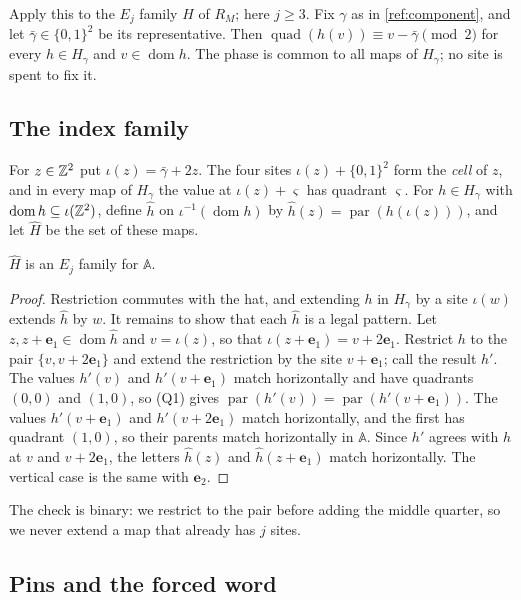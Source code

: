 Apply this to the $E_j$ family $H$ of $R_M$; here $j\ge3$. Fix $\gamma$ as in \cref{ref:component}, and let $\bar\gamma\in\{0,1\}^2$ be its representative. Then $\operatorname{quad}(h(v))\equiv v-\bar\gamma\pmod2$ for every $h\in H_\gamma$ and $v\in\operatorname{dom}h$. The phase is common to all maps of $H_\gamma$; no site is spent to fix it.

\subsection{The index family}\label{ref:sec-index}

For $z\in\mathbb{Z}^2$ put $\iota(z)=\bar\gamma+2z$. The four sites $\iota(z)+\{0,1\}^2$ form the \emph{cell} of $z$, and in every map of $H_\gamma$ the value at $\iota(z)+\varsigma$ has quadrant $\varsigma$. For $h\in H_\gamma$ with $\operatorname{dom}h\subseteq\iota(\mathbb{Z}^2)$, define $\hat h$ on $\iota^{-1}(\operatorname{dom}h)$ by $\hat h(z)=\operatorname{par}(h(\iota(z)))$, and let $\widehat H$ be the set of these maps.

\begin{lemma}\label{ref:index}
$\widehat H$ is an $E_j$ family for $\mathbb A$.
\end{lemma}

\begin{proof}
Restriction commutes with the hat, and extending $h$ in $H_\gamma$ by a site $\iota(w)$ extends $\hat h$ by $w$. It remains to show that each $\hat h$ is a legal pattern. Let $z,z+\mathbf e_1\in\operatorname{dom}\hat h$ and $v=\iota(z)$, so that $\iota(z+\mathbf e_1)=v+2\mathbf e_1$. Restrict $h$ to the pair $\{v,v+2\mathbf e_1\}$ and extend the restriction by the site $v+\mathbf e_1$; call the result $h'$. The values $h'(v)$ and $h'(v+\mathbf e_1)$ match horizontally and have quadrants $(0,0)$ and $(1,0)$, so (Q1) gives $\operatorname{par}(h'(v))=\operatorname{par}(h'(v+\mathbf e_1))$. The values $h'(v+\mathbf e_1)$ and $h'(v+2\mathbf e_1)$ match horizontally, and the first has quadrant $(1,0)$, so their parents match horizontally in $\mathbb A$. Since $h'$ agrees with $h$ at $v$ and $v+2\mathbf e_1$, the letters $\hat h(z)$ and $\hat h(z+\mathbf e_1)$ match horizontally. The vertical case is the same with $\mathbf e_2$.
\end{proof}

The check is binary: we restrict to the pair before adding the middle quarter, so we never extend a map that already has $j$ sites.

\subsection{Pins and the forced word}\label{ref:sec-pins}

